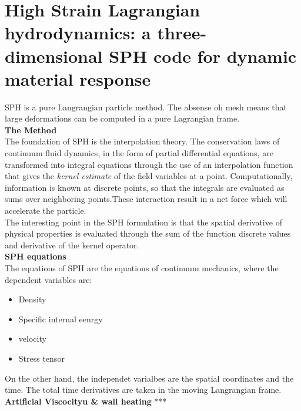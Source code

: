 \documentclass[12pt]{book}
\begin{document}
\chapter{High Strain Lagrangian hydrodynamics: a three-dimensional SPH code for dynamic material response}
SPH is a pure Langrangian particle method. The absense oh mesh means that large deformations can be computed in a pure Lagrangian frame.\cite{allahdadi93}\\

\textbf{The Method}\\
The foundation of SPH is the interpolation theory. The conservation laws of continuum fluid dynamics, in the form of partial differential equations, are transformed into integral equations through the use of an interpolation function that gives the \textit{kernel estimate} of the field variables at a point. Computationally, information is known at discrete points, so that the integrals are evaluated as sums over neighboring points.These interaction result in a net force which will accelerate the particle.\cite{allahdadi93}\\
The interesting point in the SPH formulation is that the spatial derivative of physical properties is evaluated through the sum of the function discrete values and derivative of the kernel operator.\\

\textbf{SPH equations}\\
The equations of SPH are the equations of continuum mechanics, where the dependent variables are:
\begin{itemize}
\item Density
\item Specific internal eenrgy
\item velocity
\item Stress tensor
\end{itemize}
On the other hand, the independet varialbes are the spatial coordinates and the time. The total time derivatives are taken in the moving Langrangian frame.\\

\textbf{Artificial Viscocityu \& wall heating}
***
\\
\end{document}

